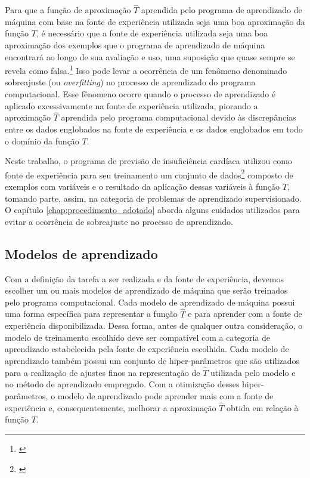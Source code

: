 Para que a função de aproximação $\hat{T}$ aprendida pelo programa de aprendizado de máquina com base na fonte de experiência utilizada seja uma boa aproximação da função $T$, é necessário que a fonte de experiência utilizada seja uma boa aproximação dos exemplos que o programa de aprendizado de máquina encontrará ao longo de sua avaliação e uso, uma suposição que quase sempre se revela como falsa.\footnote{\cite[p.6]{machine_learning}} Isso pode levar a ocorrência de um fenômeno denominado sobreajuste (ou \textit{overfitting}) no processo de aprendizado do programa computacional. Esse fênomeno ocorre quando o processo de aprendizado é aplicado excessivamente na fonte de experiência utilizada, piorando a aproximação $\hat{T}$ aprendida pelo programa computacional devido às discrepâncias entre os dados englobados na fonte de experiência e os dados englobados em todo o domínio da função $T$.

Neste trabalho, o programa de previsão de insuficiência cardíaca utilizou como fonte de experiência para seu treinamento um conjunto de dados\footnote{\cite{larxel_dataset}} composto de exemplos com variáveis e o resultado da aplicação dessas variáveis à função $T$, tomando parte, assim, na categoria de problemas de aprendizado supervisionado. O capítulo \ref{chap:procedimento_adotado} aborda alguns cuidados utilizados para evitar a ocorrência de sobreajuste no processo de aprendizado.

\subsection{Modelos de aprendizado}

Com a definição da tarefa a ser realizada e da fonte de experiência, devemos escolher um ou mais modelos de aprendizado de máquina que serão treinados pelo programa computacional. Cada modelo de aprendizado de máquina possui uma forma específica para representar a função $\hat{T}$ e para aprender com a fonte de experiência disponibilizada. Dessa forma, antes de qualquer outra consideração, o modelo de treinamento escolhido deve ser compatível com a categoria de aprendizado estabelecida pela fonte de experiência escolhida. Cada modelo de aprendizado também possui um conjunto de hiper-parâmetros que são utilizados para a realização de ajustes finos na representação de $\hat{T}$ utilizada pelo modelo e no método de aprendizado empregado. Com a otimização desses hiper-parâmetros, o modelo de aprendizado pode aprender mais com a fonte de experiência e, consequentemente, melhorar a aproximação $\hat{T}$ obtida em relação à função $T$.

